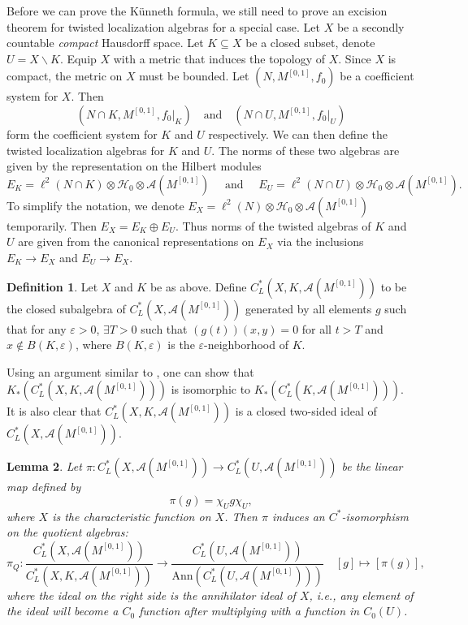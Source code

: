 \documentclass[11pt]{article}
\theoremstyle{definition}
\newtheorem{Def}{Definition}[section]
\theoremstyle{plain}
\newtheorem{Lem}[Def]{Lemma}
\def\A{\mathcal A}\def\C{\mathcal C}\def\B{\mathcal B}\def\E{\mathcal E}\def\O{\mathcal O}\def\h{\mathfrak h}\def\K{\mathcal K}\def\F{\mathcal F}\def\P{\mathcal P}\def\L{\mathcal L}\def\R{\mathcal R}\def\Q{\mathcal Q}\def\H{\mathcal H}\def\S{\mathcal S}\def\N{\mathcal N}\def\U{\mathcal U}\def\V{\mathcal V}
\def\ox{\otimes}
\def\ox{\otimes}
\begin{document}
\begin{appendices}
Before we can prove the K\"unneth formula, we still need to prove an excision theorem for twisted localization algebras for a special case. Let $X$ be a secondly countable \emph{compact} Hausdorff space. Let $K\subseteq X$ be a closed subset, denote $U=X\backslash K$. Equip $X$ with a metric that induces the topology of $X$. Since $X$ is compact, the metric on $X$ must be bounded. Let $(N,M^{[0,1]},f_0)$ be a coefficient system for $X$. Then
$$(N\cap K,M^{[0,1]},f_0|_K)\quad \text{and}\quad (N\cap U,M^{[0,1]},f_0|_U)$$
form the coefficient system for $K$ and $U$ respectively. We can then define the twisted localization algebras for $K$ and $U$. The norms of these two algebras are given by the representation on the Hilbert modules
$$E_K=\ell^2(N\cap K)\ox\H_0\ox\A(M^{[0,1]})\quad\text{ and }\quad E_{U}=\ell^2(N\cap U)\ox\H_0\ox\A(M^{[0,1]}).$$
To simplify the notation, we denote $E_X=\ell^2(N)\ox\H_0\ox\A(M^{[0,1]})$ temporarily. Then $E_X=E_K\oplus E_{U}$. Thus norms of the twisted algebras of $K$ and $U$ are given from the canonical representations on $E_X$ via the inclusions $E_{K}\to E_X$ and $E_U\to E_X$.

\begin{Def}
Let $X$ and $K$ be as above. Define $C^*_{L}(X,K,\A(M^{[0,1]}))$ to be the closed subalgebra of $C^*_{L}(X,\A(M^{[0,1]}))$ generated by all elements $g$ such that for any $\varepsilon>0$, $\exists T>0$ such that $(g(t))(x,y)=0$ for all $t>T$ and $x\notin B(K,\varepsilon)$, where $B(K,\varepsilon)$ is the $\varepsilon$-neighborhood of $K$.
\end{Def}

Using an argument similar to \cite[Lemma 3.10]{Yu1997}, one can show that $K_*(C^*_{L}(X,K,\A(M^{[0,1]})))$ is isomorphic to $K_*(C^*_{L}(K,\A(M^{[0,1]})))$. It is also clear that $C^*_{L}(X,K,\A(M^{[0,1]}))$ is a closed two-sided ideal of $C^*_L(X,\A(M^{[0,1]}))$.

\begin{Lem}\label{pi_Q}
Let $\pi:C^*_L(X,\A(M^{[0,1]}))\to C^*_L(U,\A(M^{[0,1]}))$ be the linear map defined by
$$\pi(g)=\chi_Ug\chi_U,$$
where $X$ is the characteristic function on $X$. Then $\pi$ induces an $C^*$-isomorphism on the quotient algebras:
$$\pi_Q:\frac{C^*_L(X,\A(M^{[0,1]}))}{C^*_L(X,K,\A(M^{[0,1]}))}\to\frac{C^*_L(U,\A(M^{[0,1]}))}{\mathrm{Ann}(C^*_L(U,\A(M^{[0,1]})))}\quad [g]\mapsto [\pi(g)],$$
where the ideal on the right side is the annihilator ideal of $X$, i.e., any element of the ideal will become a $C_0$ function after multiplying with a function in $C_0(U)$.
\end{Lem}


\end{appendices}
\end{document}
